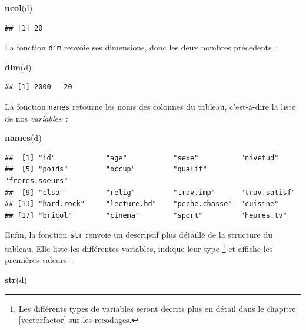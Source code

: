 \documentclass[12pt,]{book}
\newenvironment{Shaded}{\begin{snugshade}}{\end{snugshade}}
\newcommand{\KeywordTok}[1]{\textcolor[rgb]{0.13,0.29,0.53}{\textbf{#1}}}
\newcommand{\NormalTok}[1]{#1}
\begin{document}
\begin{Shaded}
\begin{Highlighting}[]
\KeywordTok{ncol}\NormalTok{(d)}
\end{Highlighting}
\end{Shaded}

\begin{verbatim}
## [1] 20
\end{verbatim}

La fonction \texttt{dim} renvoie ses dimensions, donc les deux nombres précédents~:

\begin{Shaded}
\begin{Highlighting}[]
\KeywordTok{dim}\NormalTok{(d)}
\end{Highlighting}
\end{Shaded}

\begin{verbatim}
## [1] 2000   20
\end{verbatim}

La fonction \texttt{names} retourne les noms des colonnes du tableau, c'est-à-dire la liste de nos \emph{variables}~:

\begin{Shaded}
\begin{Highlighting}[]
\KeywordTok{names}\NormalTok{(d)}
\end{Highlighting}
\end{Shaded}

\begin{verbatim}
##  [1] "id"            "age"           "sexe"          "nivetud"      
##  [5] "poids"         "occup"         "qualif"        "freres.soeurs"
##  [9] "clso"          "relig"         "trav.imp"      "trav.satisf"  
## [13] "hard.rock"     "lecture.bd"    "peche.chasse"  "cuisine"      
## [17] "bricol"        "cinema"        "sport"         "heures.tv"
\end{verbatim}

Enfin, la fonction \texttt{str} renvoie un descriptif plus détaillé de la structure du tableau. Elle liste les différentes variables, indique leur type \footnote{Les différents types de variables seront décrits plus en détail dans le chapitre \ref{vectorfactor} sur les recodages.} et affiche les premières valeurs~:

\begin{Shaded}
\begin{Highlighting}[]
\KeywordTok{str}\NormalTok{(d)}
\end{Highlighting}
\end{Shaded}
\end{document}
